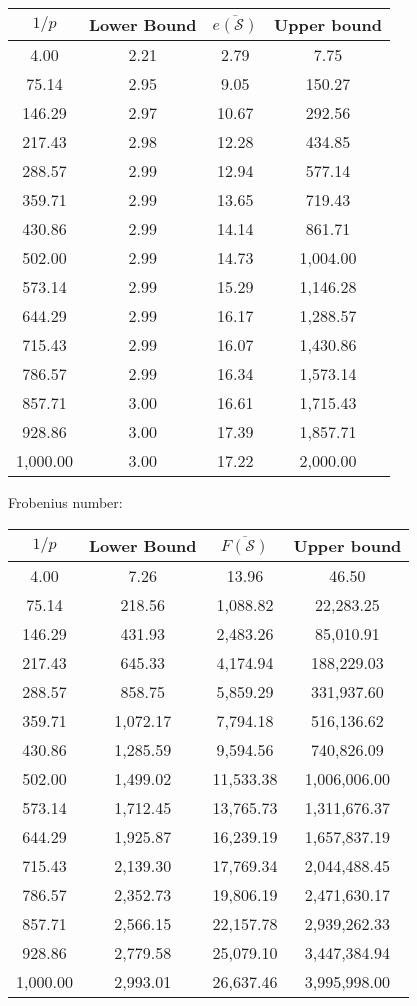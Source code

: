 \begin{tabular}{|c|c|c|c|}
    \toprule
    $1/p$ & Lower Bound & $\overline{e(\mathcal{S})}$  & Upper bound \\
    \midrule
    4.00 & 2.21 & 2.79 & 7.75 \\
    75.14 & 2.95 & 9.05 & 150.27 \\
    146.29 & 2.97 & 10.67 & 292.56 \\
    217.43 & 2.98 & 12.28 & 434.85 \\
    288.57 & 2.99 & 12.94 & 577.14 \\
    359.71 & 2.99 & 13.65 & 719.43 \\
    430.86 & 2.99 & 14.14 & 861.71 \\
    502.00 & 2.99 & 14.73 & 1,004.00 \\
    573.14 & 2.99 & 15.29 & 1,146.28 \\
    644.29 & 2.99 & 16.17 & 1,288.57 \\
    715.43 & 2.99 & 16.07 & 1,430.86 \\
    786.57 & 2.99 & 16.34 & 1,573.14 \\
    857.71 & 3.00 & 16.61 & 1,715.43 \\
    928.86 & 3.00 & 17.39 & 1,857.71 \\
    1,000.00 & 3.00 & 17.22 & 2,000.00 \\
    \bottomrule
\end{tabular}

Frobenius number:

\begin{tabular}{|c|c|c|c|}
    \toprule
    $1/p$ & Lower Bound & $\overline{F(\mathcal{S})}$ & Upper bound \\
    \midrule
    4.00 & 7.26 & 13.96 & 46.50 \\
    75.14 & 218.56 & 1,088.82 & 22,283.25 \\
    146.29 & 431.93 & 2,483.26 & 85,010.91 \\
    217.43 & 645.33 & 4,174.94 & 188,229.03 \\
    288.57 & 858.75 & 5,859.29 & 331,937.60 \\
    359.71 & 1,072.17 & 7,794.18 & 516,136.62 \\
    430.86 & 1,285.59 & 9,594.56 & 740,826.09 \\
    502.00 & 1,499.02 & 11,533.38 & 1,006,006.00 \\
    573.14 & 1,712.45 & 13,765.73 & 1,311,676.37 \\
    644.29 & 1,925.87 & 16,239.19 & 1,657,837.19 \\
    715.43 & 2,139.30 & 17,769.34 & 2,044,488.45 \\
    786.57 & 2,352.73 & 19,806.19 & 2,471,630.17 \\
    857.71 & 2,566.15 & 22,157.78 & 2,939,262.33 \\
    928.86 & 2,779.58 & 25,079.10 & 3,447,384.94 \\
    1,000.00 & 2,993.01 & 26,637.46 & 3,995,998.00 \\
    \bottomrule
\end{tabular}

